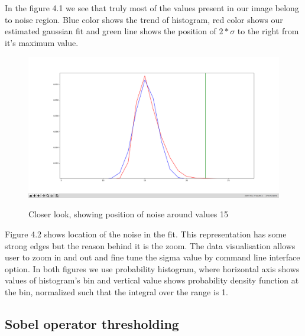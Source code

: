 \documentclass[12pt, a4paper, oneside]{book}
\begin{document}
In the figure 4.1 we see that truly most of the values present in our image belong to noise region.
Blue color shows the trend of histogram, red color shows our estimated gaussian fit and green line shows the position of $2 * \sigma$ to the right from it's maximum value.

\begin{figure}[H]
    \begin{center}
        \includegraphics[scale=0.95]{images/hist_fit_close.png}
        \label{img:background_initial_guess}
        \caption{Closer look, showing position of noise around values 15}
    \end{center}
\end{figure}

Figure 4.2 shows location of the noise in the fit.
This representation has some strong edges but the reason behind it is the zoom.
The data visualisation allows user to zoom in and out and fine tune the sigma value by command line interface option.
In both figures we use probability histogram, where horizontal axis shows values of histogram's bin and vertical value shows probability density function at the bin, normalized such that the integral over the range is 1.

\subsection{Sobel operator thresholding}
\end{document}
